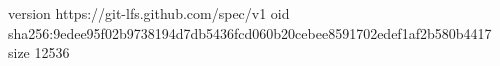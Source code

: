 version https://git-lfs.github.com/spec/v1
oid sha256:9edee95f02b9738194d7db5436fcd060b20cebee8591702edef1af2b580b4417
size 12536
